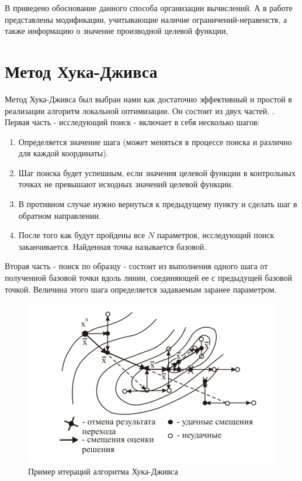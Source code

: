 \documentclass[12pt, a4paper, russian]{article}
\begin{document}
В \cite{fio_bib20} приведено обоснование данного способа организации вычислений. А в работе  \cite{fio_bib11} представлены модификации, учитывающие наличие ограничений-неравенств, а также информацию о значение производной целевой функции, 

\section{Метод Хука-Дживса}

 Метод Хука-Дживса был выбран нами как достаточно эффективный и простой в реализации алгоритм локальной оптимизации. Он состоит из двух частей.  \cite{fio_bib14, fio_bib15}. Первая часть - исследующий поиск - включает в себя несколько шагов:
 \begin{enumerate}
 	\item	Определяется значение шага (может меняться в процессе поиска и различно для каждой координаты).

 	\item	Шаг поиска будет успешным, если значения целевой функции в контрольных точках не превышают исходных значений целевой функции.

 	\item	В противном случае нужно вернуться к предыдущему пункту и сделать шаг в обратном направлении. 

 	\item	После того как будут пройдены все $N$ параметров, исследующий поиск заканчивается. Найденная точка называется базовой.
 \end{enumerate}

 Вторая часть - поиск по образцу - состоит из выполнения одного шага от полученной базовой точки вдоль линии, соединяющей ее с предыдущей базовой точкой. Величина этого шага определяется задаваемым заранее параметром.



 \begin{figure}[!h]
	\begin{center}
		\begin{minipage}[h]{0.8\linewidth}
			\includegraphics[width=1\linewidth]{figure/fig1.png}
			\caption{Пример итераций алгоритма Хука-Дживса} %
			\label{fig:fig1}
		\end{minipage}
	\end{center}
 \end{figure}	
\end{document}
